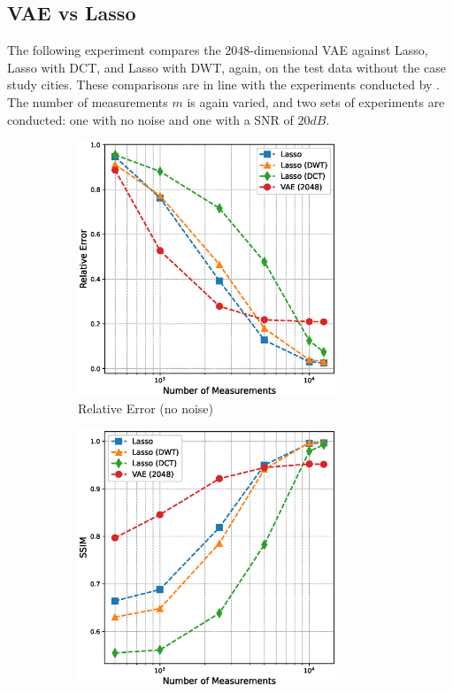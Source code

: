 \subsection{VAE vs Lasso}
The following experiment compares the $2048$-dimensional \gls{VAE} against \gls{Lasso}, \gls{Lasso} with \gls{DCT}, and \gls{Lasso} with \gls{DWT}, again, on the test data without the case study cities.
These comparisons are in line with the experiments conducted by \textcite{CSUsingAI}.
The number of measurements $m$ is again varied, and two sets of experiments are conducted: one with no noise and one with a \gls{SNR} of $20 \unit{dB}$.

\begin{figure}[htb]
    \centering
    \begin{subfigure}[b]{0.49\textwidth}
        \centering
        \includegraphics[width=0.85\textwidth]{figures/06_results/vae_benchmark/vae_vs_lasso/vae_vs_lasso_relative_error.eps}
        \caption{Relative Error (no noise)}
    \end{subfigure}
    \begin{subfigure}[b]{0.49\textwidth}
        \centering
        \includegraphics[width=0.85\textwidth]{figures/06_results/vae_benchmark/vae_vs_lasso/vae_vs_lasso_ssim.eps}

\end{subfigure}
\end{figure}
